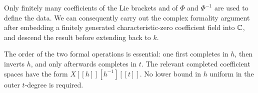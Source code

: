 Only finitely many coefficients of the Lie brackets and of $\Phi$ and
$\Phi^{-1}$ are used to define the data. We can consequently carry out the
complex formality argument after embedding a finitely generated
characteristic-zero coefficient field into $\mathbb C$, and descend the result
before extending back to $k$.

The order of the two formal operations is essential: one first completes in
$h$, then inverts $h$, and only afterwards completes in $t$.
The relevant completed coefficient spaces have the form
$X[[h]][h^{-1}][[t]]$. No lower bound in $h$ uniform in the
outer $t$-degree is required.
